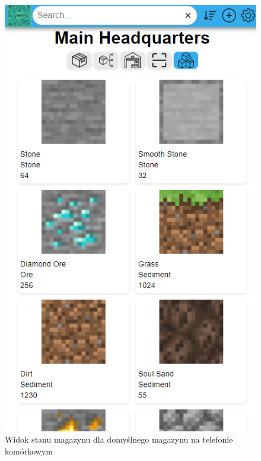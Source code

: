 \documentclass[../main.tex]{subfiles}
\begin{document}
            \begin{figure}[H]
                \centering
                \includegraphics[height=\getImageHeight]{images/app-mobile/app-stock-default-mobile.png}
                \caption{Widok stanu magazynu dla domyślnego magazynu na telefonie komórkowym}
                \label{fig:app-stock-default-mobile}
            \end{figure}
\end{document}

